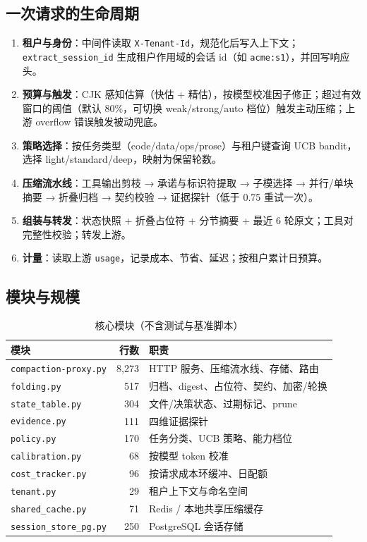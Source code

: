 \documentclass[11pt,a4paper]{ctexart}
\begin{document}
\subsection{一次请求的生命周期}
\begin{enumerate}
  \item \textbf{租户与身份}：中间件读取 \texttt{X-Tenant-Id}，规范化后写入上下文；\texttt{extract\_session\_id} 生成租户作用域的会话 id（如 \texttt{acme:s1}），并回写响应头。
  \item \textbf{预算与触发}：CJK 感知估算（快估 + 精估），按模型校准因子修正；超过有效窗口的阈值（默认 80\%，可切换 weak/strong/auto 档位）触发主动压缩；上游 overflow 错误触发被动兜底。
  \item \textbf{策略选择}：按任务类型（code/data/ops/prose）与租户键查询 UCB bandit，选择 light/standard/deep，映射为保留轮数。
  \item \textbf{压缩流水线}：工具输出剪枝 → 承诺与标识符提取 → 子模选择 → 并行/单块摘要 → 折叠归档 → 契约校验 → 证据探针（低于 0.75 重试一次）。
  \item \textbf{组装与转发}：状态快照 + 折叠占位符 + 分节摘要 + 最近 6 轮原文；工具对完整性校验；转发上游。
  \item \textbf{计量}：读取上游 \texttt{usage}，记录成本、节省、延迟；按租户累计日预算。
\end{enumerate}

\subsection{模块与规模}
\begin{table}[htbp]
\centering
\caption{核心模块（不含测试与基准脚本）}
\begin{tabular}{lrl}
\toprule
模块 & 行数 & 职责 \\
\midrule
\texttt{compaction-proxy.py} & 8,273 & HTTP 服务、压缩流水线、存储、路由 \\
\texttt{folding.py} & 517 & 归档、digest、占位符、契约、加密/轮换 \\
\texttt{state\_table.py} & 304 & 文件/决策状态、过期标记、prune \\
\texttt{evidence.py} & 111 & 四维证据探针 \\
\texttt{policy.py} & 170 & 任务分类、UCB 策略、能力档位 \\
\texttt{calibration.py} & 68 & 按模型 token 校准 \\
\texttt{cost\_tracker.py} & 96 & 按请求成本环缓冲、日配额 \\
\texttt{tenant.py} & 29 & 租户上下文与命名空间 \\
\texttt{shared\_cache.py} & 71 & Redis / 本地共享压缩缓存 \\
\texttt{session\_store\_pg.py} & 250 & PostgreSQL 会话存储 \\
\bottomrule
\end{tabular}
\end{table}
\end{document}
